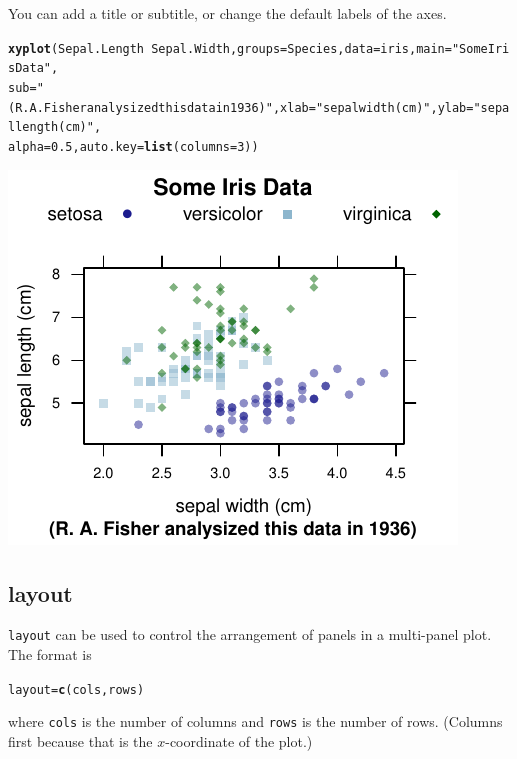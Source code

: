 \documentclass[twoside]{book}\usepackage[]{graphicx}\usepackage[]{xcolor}
\makeatletter
\def\maxwidth{ %
  \ifdim\Gin@nat@width>\linewidth
    \linewidth
  \else
    \Gin@nat@width
  \fi
}
\newcommand{\hlnum}[1]{\textcolor[rgb]{0.686,0.059,0.569}{#1}}%
\newcommand{\hlstr}[1]{\textcolor[rgb]{0.192,0.494,0.8}{#1}}%
\newcommand{\hlopt}[1]{\textcolor[rgb]{0,0,0}{#1}}%
\newcommand{\hlstd}[1]{\textcolor[rgb]{0.345,0.345,0.345}{#1}}%
\newcommand{\hlkwb}[1]{\textcolor[rgb]{0.69,0.353,0.396}{#1}}%
\newcommand{\hlkwc}[1]{\textcolor[rgb]{0.333,0.667,0.333}{#1}}%
\newcommand{\hlkwd}[1]{\textcolor[rgb]{0.737,0.353,0.396}{\textbf{#1}}}%
\newenvironment{kframe}{%
 \def\at@end@of@kframe{}%
 \ifinner\ifhmode%
  \def\at@end@of@kframe{\end{minipage}}%
  \begin{minipage}{\columnwidth}%
 \fi\fi%
 \def\FrameCommand##1{\hskip\@totalleftmargin \hskip-\fboxsep
 \colorbox{shadecolor}{##1}\hskip-\fboxsep
     \hskip-\linewidth \hskip-\@totalleftmargin \hskip\columnwidth}%
 \MakeFramed {\advance\hsize-\width
   \@totalleftmargin\z@ \linewidth\hsize
   \@setminipage}}%
 {\par\unskip\endMakeFramed%
 \at@end@of@kframe}
\newenvironment{knitrout}{}{} %
\newcommand{\option}[1]{{\color{brown!80!black}\texttt{#1}}}
\renewcommand{\code}[1]{{\color{blue!80!black}\texttt{#1}}}
\makeatother
\begin{document}
You can add a title or subtitle, or change the default labels of the axes.
\begin{knitrout}
\color{fgcolor}\begin{kframe}
\begin{alltt}
\hlkwd{xyplot}\hlstd{(Sepal.Length} \hlopt{~} \hlstd{Sepal.Width,} \hlkwc{groups} \hlstd{= Species,} \hlkwc{data} \hlstd{= iris,} \hlkwc{main} \hlstd{=} \hlstr{"Some Iris Data"}\hlstd{,}
    \hlkwc{sub} \hlstd{=} \hlstr{"(R. A. Fisher analysized this data in 1936)"}\hlstd{,} \hlkwc{xlab} \hlstd{=} \hlstr{"sepal width (cm)"}\hlstd{,} \hlkwc{ylab} \hlstd{=} \hlstr{"sepal length (cm)"}\hlstd{,}
    \hlkwc{alpha} \hlstd{=} \hlnum{0.5}\hlstd{,} \hlkwc{auto.key} \hlstd{=} \hlkwd{list}\hlstd{(}\hlkwc{columns} \hlstd{=} \hlnum{3}\hlstd{))}
\end{alltt}
\end{kframe}

{\centering \includegraphics[width=\maxwidth]{figures/fig-iris-xyplot-text-1} 

}



\end{knitrout}

\subsection*{layout}

\option{layout} can be used to control the arrangement of panels in a multi-panel
plot.  The format is
\begin{knitrout}
\color{fgcolor}\begin{kframe}
\begin{alltt}
\hlstd{layout} \hlkwb{=} \hlkwd{c}\hlstd{(cols, rows)}
\end{alltt}
\end{kframe}
\end{knitrout}
where \code{cols} is the number of columns and \code{rows} is the number of 
rows.  (Columns first because that is the $x$-coordinate of the plot.)
\end{document}
